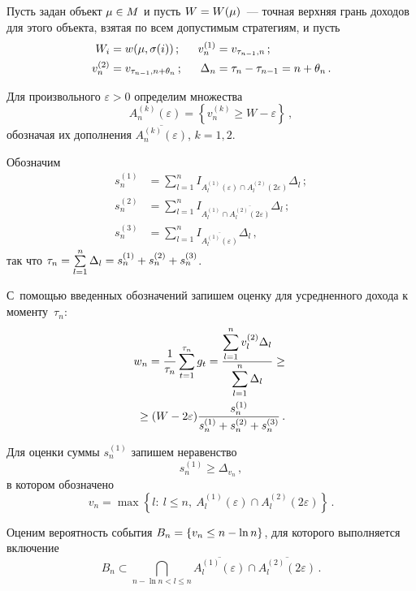 \begin{multicols}{2}
  Пусть задан объект $\mu\hm\in M$ и пусть $W\hm=W(\mu)$~--- точная верхняя грань 
доходов для этого объекта, взятая по всем допустимым стратегиям, и пусть %
  \begin{alignat*}{2}
  W_i&=w(\mu,\sigma(i))\,; &\enskip v_n^{(1)}&=v_{\tau_{n-1},n}\,;\\
  v_n^{(2)}&=v_{\tau_{n-1},n+\theta_n}\,; &\enskip \Delta_n&=\tau_n-\tau_{n-1}=n+\theta_n\,.
  \end{alignat*}
  
  Для произвольного $\varepsilon>0$ определим множества
  $$
  A_n^{(k)}(\varepsilon)=\left\{ v_n^{(k)}\geq W-\varepsilon\right\}\,,
  $$
обозначая их дополнения $\overline{A_n^{(k)}(\varepsilon)}$, $k=1, 2$.
  
  Обозначим
  \begin{align*}
  s_n^{(1)} &= \sum\limits_{l=1}^n I_{A_l^{(1)}(\varepsilon)\cap 
{A_l^{(2)}(2\varepsilon)}} \Delta_l\,;\\
  s_n^{(2)} &= \sum\limits_{l=1}^n I_{A_l^{(1)}\cap 
\overline{A_l^{(2)}(2\varepsilon)}}\Delta_l\,;\\
  s_n^{(3)} &= \sum\limits_{l=1}^n I_{\overline{A_l^{(1)}(\varepsilon)}}\Delta_l\,,
  \end{align*}
так что $\tau_n\hm=\sum\limits_{l=1}^n \Delta_l\hm= s_n^{(1)}\hm+ s_n^{(2)}\hm+ 
s_n^{(3)}$.

\columnbreak

  
  С~помощью введенных обозначений запишем оценку для усредненного дохода к 
моменту~$\tau_n$:
  \begin{multline}
  w_n=\displaystyle\frac{\displaystyle 1\mathstrut}{\displaystyle \tau_n\mathstrut}\sum\limits_{t=1}^{\tau_n} g_t=\displaystyle\frac{\displaystyle \sum\limits_{l=1}^n 
v_l^{(2)}\Delta_l\mathstrut}{\displaystyle \sum\limits_{l=1}^n \Delta_l\mathstrut}\geq{}\\
{}\geq (W-2\varepsilon) \displaystyle\frac{\displaystyle s_n^{(1)}\mathstrut}{\displaystyle s_n^{(1)}+s_n^{(2)}+s_n^{(3)}\mathstrut}\,.
  \label{e1-kon}
  \end{multline}
  
  Для оценки суммы $s_n^{(1)}$ запишем неравенство
  $$
  s_n^{(1)}\geq \Delta_{v_n}\,,
  $$
в котором обозначено
$$
v_n=\max\left\{ l:\ l\leq n,\ A_l^{(1)}(\varepsilon)\cap A_l^{(2)}(2\varepsilon)\right\}\,.
$$
  
  Оценим вероятность события $B_n\hm=\{v_n\hm\leq n-\ln n\}$, для которого выполняется 
включение
  $$
  B_n\subset \bigcap\limits_{n-\ln n<l\leq n} 
  \overline{A_l^{(1)}(\varepsilon)}\cap \overline{A_l^{(2)}(2\varepsilon)}\,.
  $$
  

\end{multicols}
